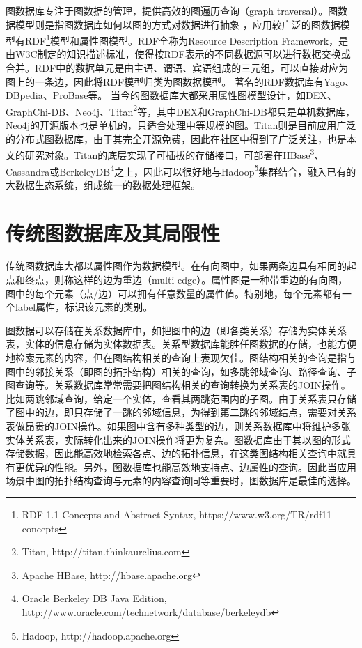 图数据库专注于图数据的管理，提供高效的图遍历查询（graph traversal）。图数据模型则是指图数据库如何以图的方式对数据进行抽象 \supercite{graph_models_survey}，应用较广泛的图数据模型有RDF\footnote{RDF 1.1 Concepts and Abstract Syntax, https://www.w3.org/TR/rdf11-concepts }模型和属性图\supercite{property_graph}模型。RDF全称为Resource Description Framework，是由W3C制定的知识描述标准，使得按RDF表示的不同数据源可以进行数据交换或合并。RDF中的数据单元是由主语、谓语、宾语组成的三元组，可以直接对应为图上的一条边，因此将RDF模型归类为图数据模型。
著名的RDF数据库有Yago\supercite{yago}、DBpedia\supercite{dbpedia}、ProBase\supercite{probase}等。
当今的图数据库大都采用属性图模型设计\supercite{graph_database_models}，如DEX\supercite{DEX}、GraphChi-DB\supercite{graphchi-db}、Neo4j\supercite{neo4j}、Titan\footnote{Titan, http://titan.thinkaurelius.com}等，其中DEX和GraphChi-DB都只是单机数据库，Neo4j的开源版本也是单机的，只适合处理中等规模的图。Titan则是目前应用广泛的分布式图数据库，由于其完全开源免费，因此在社区中得到了广泛关注，也是本文的研究对象。Titan的底层实现了可插拔的存储接口，可部署在HBase\footnote{Apache HBase, http://hbase.apache.org }、Cassandra\supercite{cassandra}或BerkeleyDB\footnote{Oracle Berkeley DB Java Edition, http://www.oracle.com/technetwork/database/berkeleydb }之上，因此可以很好地与Hadoop\footnote{Hadoop, http://hadoop.apache.org }集群结合，融入已有的大数据生态系统，组成统一的数据处理框架。

\section{传统图数据库及其局限性}
传统图数据库大都以属性图作为数据模型。在有向图中，如果两条边具有相同的起点和终点，则称这样的边为重边（multi-edge）。属性图\supercite{property_graph}是一种带重边的有向图，图中的每个元素（点/边）可以拥有任意数量的属性值。特别地，每个元素都有一个label属性，标识该元素的类别。

图数据可以存储在关系数据库中，如把图中的边（即各类关系）存储为实体关系表，实体的信息存储为实体数据表。关系型数据库能胜任图数据的存储，也能方便地检索元素的内容，但在图结构相关的查询上表现欠佳。图结构相关的查询是指与图中的邻接关系（即图的拓扑结构）相关的查询，如多跳邻域查询、路径查询、子图查询等。关系数据库常常需要把图结构相关的查询转换为关系表的JOIN操作。比如两跳邻域查询，给定一个实体，查看其两跳范围内的子图。由于关系表只存储了图中的边，即只存储了一跳的邻域信息，为得到第二跳的邻域结点，需要对关系表做昂贵的JOIN操作。如果图中含有多种类型的边，则关系数据库中将维护多张实体关系表，实际转化出来的JOIN操作将更为复杂。图数据库由于其以图的形式存储数据，因此能高效地检索各点、边的拓扑信息，在这类图结构相关查询中就具有更优异的性能。另外，图数据库也能高效地支持点、边属性的查询。因此当应用场景中图的拓扑结构查询与元素的内容查询同等重要时，图数据库是最佳的选择。

